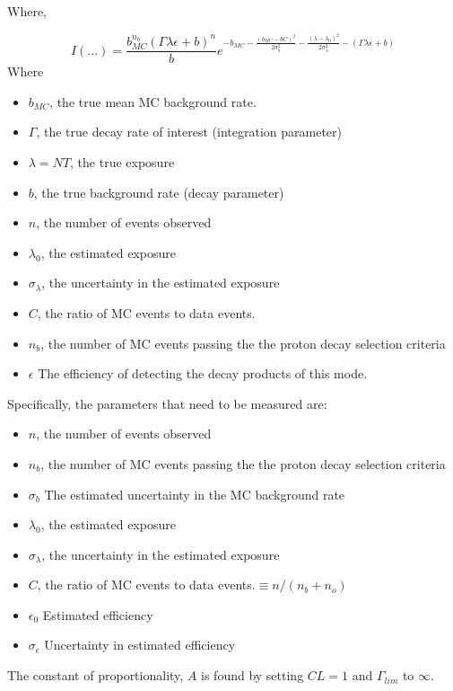 \documentclass[journal, a4paper]{IEEEtran}
\begin{document}
	Where,
	
	\begin{equation}
		I(...) = \frac{b_{MC}^{n_b}(\Gamma\lambda \epsilon+b)^n}{b}
		e^{-b_{MC}-\frac{(b_{MC}-bC)^2}{2\sigma_b^2}-\frac{(\lambda-\lambda_0)^2}{2\sigma^2_\lambda }-(\Gamma\lambda\epsilon+b)}
	\end{equation}
	Where
	\begin{itemize}
		\item $b_{MC}$, the true mean MC background rate.
		\item $\Gamma$, the true decay rate of interest (integration parameter)
		\item $\lambda = NT$, the true exposure
		\item $b$, the true background rate (decay parameter)
		\item $n$, the number of events observed
		\item $\lambda_0$, the estimated exposure
		\item $\sigma_\lambda$, the uncertainty in the estimated exposure
		\item $C$, the ratio of MC events to data events.
		\item $n_b$, the number of MC events passing the the proton decay selection criteria
		\item $\epsilon$ The efficiency of detecting the decay products of this mode.
	\end{itemize}
	
	Specifically, the parameters that need to be measured are:
	\begin{itemize}
		\item $n$, the number of events observed
		\item $n_b$, the number of MC events passing the the proton decay selection criteria
		\item $\sigma_b$ The estimated uncertainty in the MC background rate
		\item $\lambda_0$, the estimated exposure
		\item $\sigma_\lambda$, the uncertainty in the estimated exposure
		\item $C$, the ratio of MC events to data events.$\equiv n/(n_b+n_o)$
		\item $\epsilon_0$ Estimated efficiency
		\item $\sigma_\epsilon$ Uncertainty in estimated efficiency
	\end{itemize}	

	The constant of proportionality, $A$ is found by setting $CL=1$ and $\Gamma_{lim}$ to $\infty$.
	
\end{document}
